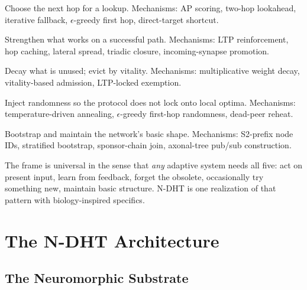 \documentclass[twoside,nobib]{tufte-book}
\newcommand{\NDHT}{N-DHT\xspace}
\begin{document}
\begin{description}\setlength\itemsep{0.4em}

\item[\textsc{navigate}] Choose the next hop for a lookup.
Mechanisms: AP scoring, two-hop lookahead, iterative fallback,
$\epsilon$-greedy first hop, direct-target shortcut.

\item[\textsc{learn}] Strengthen what works on a successful path.
Mechanisms: LTP reinforcement, hop caching, lateral spread,
triadic closure, incoming-synapse promotion.

\item[\textsc{forget}] Decay what is unused; evict by vitality.
Mechanisms: multiplicative weight decay, vitality-based admission,
LTP-locked exemption.

\item[\textsc{explore}] Inject randomness so the protocol does not
lock onto local optima. Mechanisms: temperature-driven annealing,
$\epsilon$-greedy first-hop randomness, dead-peer reheat.

\item[\textsc{structure}] Bootstrap and maintain the network's
basic shape. Mechanisms: S2-prefix node IDs, stratified bootstrap,
sponsor-chain join, axonal-tree pub/sub construction.

\end{description}

The frame is universal in the sense that \emph{any} adaptive
system needs all five: act on present input, learn from feedback,
forget the obsolete, occasionally try something new, maintain
basic structure. \NDHT is one realization of that pattern with
biology-inspired specifics.


\part{The N-DHT Architecture}


\chapter{The Neuromorphic Substrate}
\label{ch:substrate}
\end{document}
